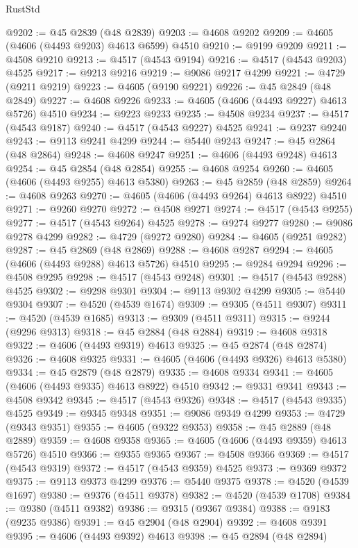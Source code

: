 \begin{lexlean}{RustStd}
\begin{coremodule}
@9202 := @45 @2839 (@48 @2839)
@9203 := @4608 @9202
@9209 := @4605 (@4606 (@4493 @9203) @4613 @6599) @4510
@9210 := @9199 @9209
@9211 := @4508 @9210
@9213 := @4517 (@4543 @9194)
@9216 := @4517 (@4543 @9203) @4525
@9217 := @9213 @9216
@9219 := @9086 @9217 @4299
@9221 := @4729 (@9211 @9219)
@9223 := @4605 (@9190 @9221)
@9226 := @45 @2849 (@48 @2849)
@9227 := @4608 @9226
@9233 := @4605 (@4606 (@4493 @9227) @4613 @5726) @4510
@9234 := @9223 @9233
@9235 := @4508 @9234
@9237 := @4517 (@4543 @9187)
@9240 := @4517 (@4543 @9227) @4525
@9241 := @9237 @9240
@9243 := @9113 @9241 @4299
@9244 := @5440 @9243
@9247 := @45 @2864 (@48 @2864)
@9248 := @4608 @9247
@9251 := @4606 (@4493 @9248) @4613
@9254 := @45 @2854 (@48 @2854)
@9255 := @4608 @9254
@9260 := @4605 (@4606 (@4493 @9255) @4613 @5380)
@9263 := @45 @2859 (@48 @2859)
@9264 := @4608 @9263
@9270 := @4605 (@4606 (@4493 @9264) @4613 @8922) @4510
@9271 := @9260 @9270
@9272 := @4508 @9271
@9274 := @4517 (@4543 @9255)
@9277 := @4517 (@4543 @9264) @4525
@9278 := @9274 @9277
@9280 := @9086 @9278 @4299
@9282 := @4729 (@9272 @9280)
@9284 := @4605 (@9251 @9282)
@9287 := @45 @2869 (@48 @2869)
@9288 := @4608 @9287
@9294 := @4605 (@4606 (@4493 @9288) @4613 @5726) @4510
@9295 := @9284 @9294
@9296 := @4508 @9295
@9298 := @4517 (@4543 @9248)
@9301 := @4517 (@4543 @9288) @4525
@9302 := @9298 @9301
@9304 := @9113 @9302 @4299
@9305 := @5440 @9304
@9307 := @4520 (@4539 @1674)
@9309 := @9305 (@4511 @9307)
@9311 := @4520 (@4539 @1685)
@9313 := @9309 (@4511 @9311)
@9315 := @9244 (@9296 @9313)
@9318 := @45 @2884 (@48 @2884)
@9319 := @4608 @9318
@9322 := @4606 (@4493 @9319) @4613
@9325 := @45 @2874 (@48 @2874)
@9326 := @4608 @9325
@9331 := @4605 (@4606 (@4493 @9326) @4613 @5380)
@9334 := @45 @2879 (@48 @2879)
@9335 := @4608 @9334
@9341 := @4605 (@4606 (@4493 @9335) @4613 @8922) @4510
@9342 := @9331 @9341
@9343 := @4508 @9342
@9345 := @4517 (@4543 @9326)
@9348 := @4517 (@4543 @9335) @4525
@9349 := @9345 @9348
@9351 := @9086 @9349 @4299
@9353 := @4729 (@9343 @9351)
@9355 := @4605 (@9322 @9353)
@9358 := @45 @2889 (@48 @2889)
@9359 := @4608 @9358
@9365 := @4605 (@4606 (@4493 @9359) @4613 @5726) @4510
@9366 := @9355 @9365
@9367 := @4508 @9366
@9369 := @4517 (@4543 @9319)
@9372 := @4517 (@4543 @9359) @4525
@9373 := @9369 @9372
@9375 := @9113 @9373 @4299
@9376 := @5440 @9375
@9378 := @4520 (@4539 @1697)
@9380 := @9376 (@4511 @9378)
@9382 := @4520 (@4539 @1708)
@9384 := @9380 (@4511 @9382)
@9386 := @9315 (@9367 @9384)
@9388 := @9183 (@9235 @9386)
@9391 := @45 @2904 (@48 @2904)
@9392 := @4608 @9391
@9395 := @4606 (@4493 @9392) @4613
@9398 := @45 @2894 (@48 @2894)

\end{coremodule}
\end{lexlean}
